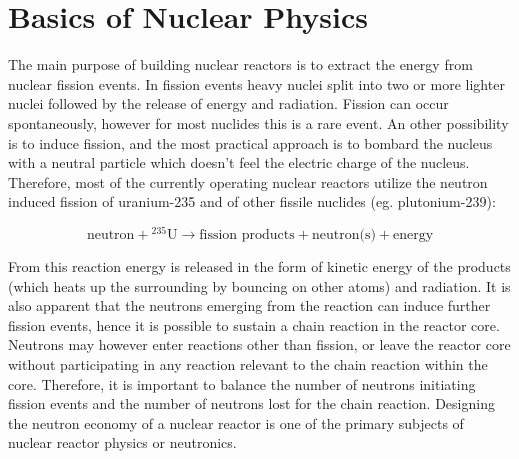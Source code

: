 % 
%
% 
%
%
%
%
%

\section{Basics of Nuclear Physics}

The main purpose of building nuclear reactors is to extract the energy from nuclear fission events. In fission events heavy nuclei split into two or more lighter nuclei followed by the release of energy and radiation. Fission can occur spontaneously, however for most nuclides this is a rare event. An other possibility is to induce fission, and the most practical approach is to bombard the nucleus with a neutral particle which doesn't feel the electric charge of the nucleus. Therefore, most of the currently operating nuclear reactors utilize the neutron induced fission of uranium-235 and of other fissile nuclides (eg. plutonium-239):

\[
\text{neutron}+{}^{235}\text{U} \rightarrow \text{fission products} + \text{neutron(s)} + \text{energy}
\]

From this reaction energy is released in the form of kinetic energy of the products (which heats up the surrounding by bouncing on other atoms) and radiation. It is also apparent that the neutrons emerging from the reaction can induce further fission events, hence it is possible to sustain a chain reaction in the reactor core. Neutrons may however enter reactions other than fission, or leave the reactor core without participating in any reaction relevant to the chain reaction within the core. Therefore, it is important to balance the number of neutrons initiating fission events and the number of neutrons lost for the chain reaction. Designing the neutron economy of a nuclear reactor is one of the primary subjects of nuclear reactor physics or neutronics. 

